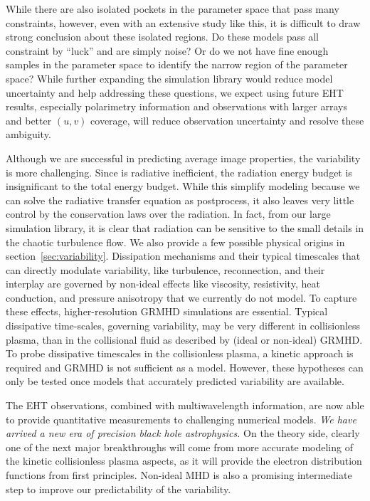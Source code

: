 While there are also isolated pockets in the parameter space that pass
many constraints, however, even with an extensive study like this, it
is difficult to draw strong conclusion about these isolated regions.
Do these models pass all constraint by ``luck'' and are simply noise?
Or do we not have fine enough samples in the parameter space to
identify the narrow region of the parameter space?
While further expanding the simulation library would reduce model
uncertainty and help addressing these questions, we expect using
future EHT results, especially polarimetry information and
observations with larger arrays and better $(u, v)$ coverage, will
reduce observation uncertainty and resolve these ambiguity.

Although we are successful in predicting average image properties, the
variability is more challenging.
Since \sgra is radiative inefficient, the radiation energy budget is
insignificant to the total energy budget.
While this simplify modeling because we can solve the radiative
transfer equation as postprocess, it also leaves very little control
by the conservation laws over the radiation.
In fact, from our large simulation library, it is clear that radiation
can be sensitive to the small details in the chaotic turbulence flow.
We also provide a few possible physical origins in
section~\ref{sec:variability}.
Dissipation mechanisms and their typical timescales that can directly
modulate variability, like turbulence, reconnection, and their
interplay are governed by non-ideal effects like viscosity,
resistivity, heat conduction, and pressure anisotropy that we
currently do not model.
To capture these effects, higher-resolution GRMHD simulations are
essential.
Typical dissipative time-scales, governing variability, may be very
different in collisionless plasma, than in the collisional fluid as
described by (ideal or non-ideal) GRMHD.
To probe dissipative timescales in the collisionless plasma, a kinetic
approach is required and GRMHD is not sufficient as a model.
However, these hypotheses can only be tested once models that
accurately predicted variability are available.

The EHT observations, combined with multiwavelength information, are
now able to provide quantitative measurements to challenging numerical
models.
\emph{We have arrived a new era of precision black hole astrophysics.}
On the theory side, clearly one of the next major breakthroughs will
come from more accurate modeling of the kinetic collisionless plasma
aspects, as it will provide the electron distribution functions from
first principles.
Non-ideal MHD is also a promising intermediate step to improve our
predictability of the variability.

